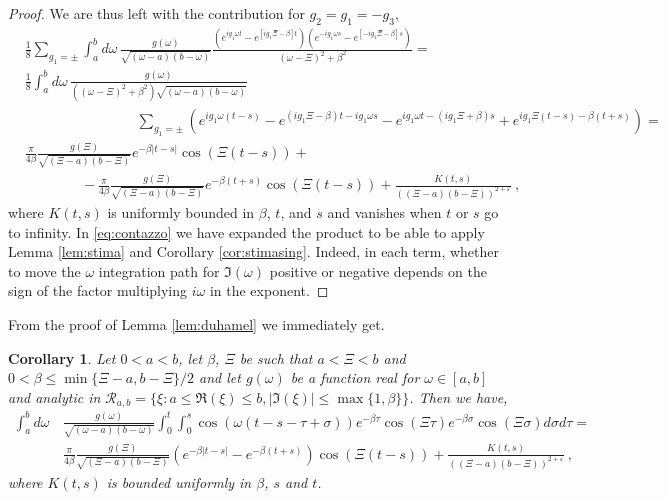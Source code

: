 \documentclass[11pt]{article}
\numberwithin{equation}{section}
\newtheorem{coro}[theorem]{Corollary}
\numberwithin{theorem}{section}
\newcommand{\e}{\varepsilon}
\newcommand{\dam}{\beta}
\begin{document}
\begin{proof}
We are thus left with the contribution for $g_2=g_1=-g_3$, 
\begin{equation}\label{eq:contazzo}
\begin{aligned}
&\frac 18\sum_{g_1=\pm}\int_{a}^{b}d\omega\, \frac{g(\omega)}{\sqrt{(\omega-a)(b-\omega)}}
\frac{\left(e^{ig_1\omega t}-e^{[ig_1\Xi-\dam]t}\right)\left(e^{-ig_1\omega 
s}-e^{[-ig_1\Xi-\dam]s}\right)}{(\omega-\Xi)^2+\beta^2}=\\
&\frac 18\int_{a}^{b}d\omega\, \frac{g(\omega)}{((\omega-\Xi)^2+\dam^2) \sqrt{(\omega-a)(b-\omega)}}\\
&\qquad\qquad\qquad\qquad\sum_{g_1=\pm}\left(e^{ig_1\omega(t-s)}-e^{(ig_1\Xi-\dam)t-ig_1\omega s}-e^{ig_1\omega t - 
(ig_1\Xi+\dam)s}+
e^{ig_1\Xi(t-s)-\dam(t+s)}\right)=\\
&\frac {\pi}{4\dam}\frac{g(\Xi)}{\sqrt{(\Xi-a)(b-\Xi)}}e^{-\dam|t-s|}\cos(\Xi(t-s))+\\
&\qquad\qquad
-\frac
\pi{4\dam}\frac{g(\Xi)}{\sqrt{(\Xi-a)(b-\Xi)}}
e^{-\dam(t+s)}\cos(\Xi(t-s))+\frac{K(t,s)}{\left((\Xi-a)(b-\Xi)\right)^{2+\e}}\ , 
\end{aligned}
\end{equation}
where $K(t,s)$ is uniformly bounded in $\dam$, $t$, and $s$ and vanishes when $t$ or $s$ go to infinity. In 
\eqref{eq:contazzo} we have expanded the product to be able to apply Lemma \ref{lem:stima} and Corollary 
\ref{cor:stimasing}. Indeed, in each term, whether to move the $\omega$ integration path for $\Im(\omega)$ positive or 
negative depends on the sign of the factor multiplying $i\omega$ in
the exponent.

\end{proof}

From the proof of Lemma \ref{lem:duhamel} we immediately get.

\begin{coro}\label{cor:duhamel}
Let $0<a<b$, let $\dam$, $\Xi$ be such that $a<\Xi<b$ and $0<\dam\leq \min\{\Xi-a,b-\Xi\}/2$ and let $g(\omega)$ be a function real
for $\omega\in [a,b]$ and analytic in $\mathcal R_{a,b}= \{\xi: a\le\Re(\xi)\le b, |\Im(\xi)|\le
\max\{1,\dam\}\}$. Then we have, 
\begin{equation}\label{eq:duhas}
\begin{aligned}
 \int_{a}^{b}d\omega\,& \frac{g(\omega)}{\sqrt{(\omega-a)(b-\omega)}} 
 \int_0^t\int_0^s\cos(\omega(t-s-\tau+\sigma))
 e^{-\dam \tau}\cos(\Xi\tau)e^{-\dam\sigma}\cos(\Xi\sigma)d\sigma d\tau=\\
&\frac{\pi}{4\dam}\frac{g(\Xi)}{\sqrt{(\Xi-a)(b-\Xi)}}  
\left(e^{-\dam|t-s|}-e^{-\dam(t+s)}\right)\cos(\Xi(t-s))+
\frac{K(t,s)}{\left((\Xi-a)(b-\Xi)\right)^{2+\e}}\ ,
\end{aligned}
\end{equation}
where $K(t,s)$ is bounded uniformly in $\beta$, $s$ and $t$.
\end{coro}
\end{document}
